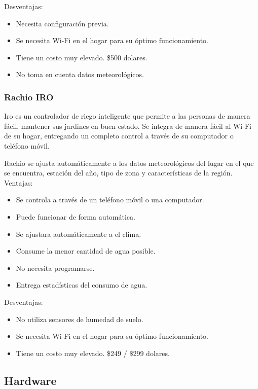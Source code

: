 \documentclass[11pt,letterpaper]{article}
\begin{document}
Desventajas:
\begin{itemize}
\item Necesita configuración previa.
\item Se necesita Wi-Fi en el hogar para su óptimo funcionamiento.
\item Tiene un costo muy elevado. \$500 dolares.
\item No toma en cuenta datos meteorológicos.
\end{itemize}

\subsubsection{Rachio IRO}

Iro\citep{rachio} es un controlador de riego inteligente que permite a las personas de manera fácil, mantener sus jardines en buen estado. Se integra de manera fácil al Wi-Fi de su hogar, entregando un completo control a través de su computador o teléfono móvil.

Rachio se ajusta automáticamente a los datos meteorológicos del lugar en el que se encuentra, estación del año, tipo de zona y características de la región.\\

Ventajas:
\begin{itemize}
\item Se controla a través de un teléfono móvil o una computador.
\item Puede funcionar de forma automática. 
\item Se ajustara automáticamente a el clima.
\item Consume la menor cantidad de agua posible.
\item No necesita programarse.
\item Entrega estadísticas del consumo de agua.
\end{itemize}

Desventajas:
\begin{itemize}
\item No utiliza sensores de humedad de suelo.
\item Se necesita Wi-Fi en el hogar para su óptimo funcionamiento.
\item Tiene un costo muy elevado. \$249 / \$299 dolares.
\end{itemize}


\subsection{Hardware}
\end{document}
